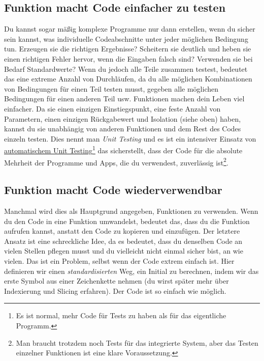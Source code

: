 \documentclass[
]{book}
\begin{document}
\hypertarget{funktion-macht-code-einfacher-zu-testen}{%
\subsection{Funktion macht Code einfacher zu testen}\label{funktion-macht-code-einfacher-zu-testen}}

Du kannst sogar mäßig komplexe Programme nur dann erstellen, wenn du sicher sein kannst, was individuelle Codeabschnitte unter jeder möglichen Bedingung tun. Erzeugen sie die richtigen Ergebnisse? Scheitern sie deutlich und heben sie einen richtigen Fehler hervor, wenn die Eingaben falsch sind? Verwenden sie bei Bedarf Standardwerte? Wenn du jedoch alle Teile zusammen testest, bedeutet das eine extreme Anzahl von Durchläufen, da du alle möglichen Kombinationen von Bedingungen für einen Teil testen musst, gegeben alle möglichen Bedingungen für einen anderen Teil usw. Funktionen machen dein Leben viel einfacher. Da sie einen einzigen Einstiegspunkt, eine feste Anzahl von Parametern, einen einzigen Rückgabewert und Isolation (siehe oben) haben, kannst du sie unabhängig von anderen Funktionen und dem Rest des Codes einzeln testen. Dies nennt man \emph{Unit Testing} und es ist ein intensiver Einsatz von \href{https://docs.python.org/3/library/unittest.html}{automatischem Unit Testing}\footnote{Es ist normal, mehr Code für Tests zu haben als für das eigentliche Programm.} das sicherstellt, dass der Code für die absolute Mehrheit der Programme und Apps, die du verwendest, zuverlässig ist\footnote{Man braucht trotzdem noch Tests für das integrierte System, aber das Testen einzelner Funktionen ist eine klare Voraussetzung.}.

\hypertarget{funktion-macht-code-wiederverwendbar}{%
\subsection{Funktion macht Code wiederverwendbar}\label{funktion-macht-code-wiederverwendbar}}

Manchmal wird dies als Hauptgrund angegeben, Funktionen zu verwenden. Wenn du den Code in eine Funktion umwandelst, bedeutet das, dass du die Funktion aufrufen kannst, anstatt den Code zu kopieren und einzufügen. Der letztere Ansatz ist eine schreckliche Idee, da es bedeutet, dass du denselben Code an vielen Stellen pflegen musst und du vielleicht nicht einmal sicher bist, an wie vielen. Das ist ein Problem, selbst wenn der Code extrem einfach ist. Hier definieren wir einen \emph{standardisierten} Weg, ein Initial zu berechnen, indem wir das erste Symbol aus einer Zeichenkette nehmen (du wirst später mehr über Indexierung und Slicing erfahren). Der Code ist so einfach wie möglich.
\end{document}

